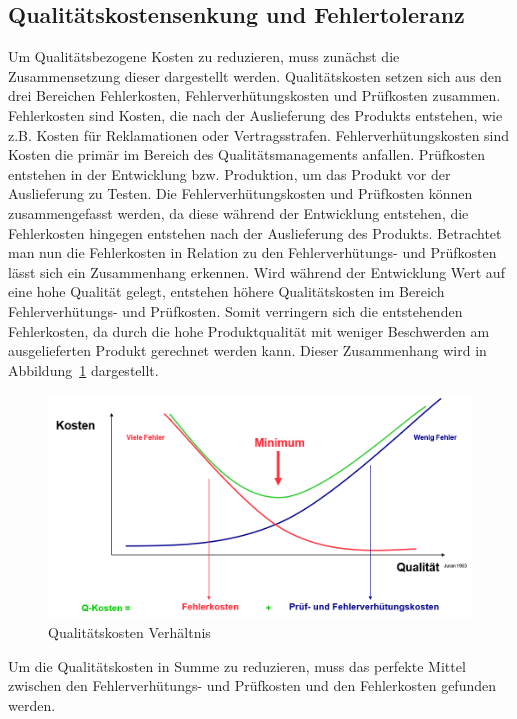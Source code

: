 \subsection{Qualitätskostensenkung und Fehlertoleranz}
Um Qualitätsbezogene Kosten zu reduzieren, muss zunächst die Zusammensetzung dieser dargestellt werden.
Qualitätskosten setzen sich aus den drei Bereichen Fehlerkosten, Fehlerverhütungskosten und Prüfkosten zusammen.
Fehlerkosten sind Kosten, die nach der Auslieferung des Produkts entstehen, wie z.B. Kosten für Reklamationen oder Vertragsstrafen.
Fehlerverhütungskosten sind Kosten die primär im Bereich des Qualitätsmanagements anfallen.
Prüfkosten entstehen in der Entwicklung bzw. Produktion, um das Produkt vor der Auslieferung zu Testen.
Die Fehlerverhütungskosten und Prüfkosten können zusammengefasst werden, da diese während der Entwicklung entstehen, die Fehlerkosten hingegen entstehen nach der Auslieferung des Produkts.
\newparagraph
Betrachtet man nun die Fehlerkosten in Relation zu den Fehlerverhütungs- und Prüfkosten lässt sich ein Zusammenhang erkennen.
Wird während der Entwicklung Wert auf eine hohe Qualität gelegt, entstehen höhere Qualitätskosten im Bereich Fehlerverhütungs- und Prüfkosten. 
Somit verringern sich die entstehenden Fehlerkosten, da durch die hohe Produktqualität mit weniger Beschwerden am ausgelieferten Produkt gerechnet werden kann.
Dieser Zusammenhang wird in Abbildung~\ref{fig:QKostenVerhaeltnis} dargestellt.
\begin{figure}[H]
    \centering
    \includegraphics[width=1\textwidth]{images/qkostenverhaeltnis.png}
    \caption{Qualitätskosten Verhältnis}
    \label{fig:QKostenVerhaeltnis}
\end{figure}\noindent
Um die Qualitätskosten in Summe zu reduzieren, muss das perfekte Mittel zwischen den Fehlerverhütungs- und Prüfkosten und den Fehlerkosten gefunden werden.

